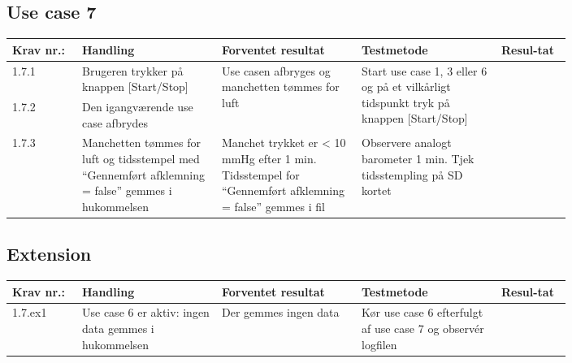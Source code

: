 					
					\subsection{Use case 7}
						\begin{longtable}{|p{0.1\linewidth}|p{0.2\linewidth}|p{0.2\linewidth}|p{0.2\linewidth}|p{0.1\linewidth}|}
							\hline
							Krav nr.: & Handling & Forventet resultat & Testmetode & Resul-tat  \\\hline
							1.7.1 & Brugeren trykker på knappen [Start/Stop] & \multirow{2}{\linewidth}{Use casen afbryges og manchetten tømmes for luft} & \multirow{2}{\linewidth}{Start use case 1, 3 eller 6 og på et vilkårligt tidspunkt tryk på knappen [Start/Stop]} & \multirow{2}{\linewidth}{} \\ \cline{1-2}
							1.7.2 & Den igangværende use case afbrydes & & & \\ \hline
							1.7.3 & Manchetten tømmes for luft og tidsstempel med “Gennemført afklemning = false” gemmes i hukommelsen & Manchet trykket er < 10 mmHg efter 1 min. Tidsstempel for  “Gennemført afklemning = false” gemmes i fil & Observere analogt barometer 1 min.
							Tjek tidsstempling på SD kortet & \\ \hline
						\end{longtable}
						
						\pagebreak
					
					\subsection*{Extension}
						\begin{longtable}{|p{0.1\linewidth}|p{0.2\linewidth}|p{0.2\linewidth}|p{0.2\linewidth}|p{0.1\linewidth}|}
							\hline
							Krav nr.: & Handling & Forventet resultat & Testmetode & Resul-tat  \\\hline
							1.7.ex1 & Use case 6 er aktiv: ingen data gemmes i hukommelsen & Der gemmes ingen data & Kør use case 6 efterfulgt af use case 7 og observér logfilen & \\ \hline
						\end{longtable}
					
